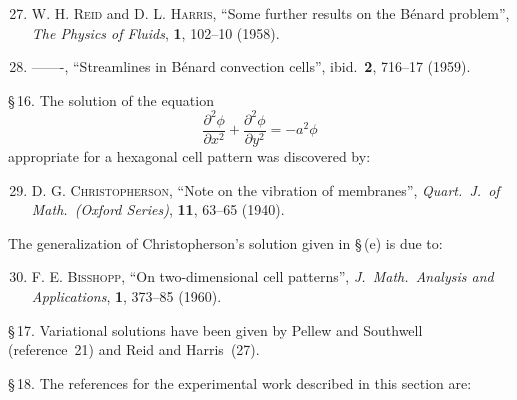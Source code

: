 \begin{enumerate}
\setcounter{enumi}{26}

\item \textsc{W. H. Reid} and \textsc{D. L. Harris}, ``Some further results on the B\'enard
  problem'', \textit{The Physics of Fluids}, \textbf{1}, 102--10 (1958).

\item -------, ``Streamlines in B\'enard convection cells'', ibid.\ \textbf{2}, 716--17
  (1959).

\end{enumerate}

\noindent \S\,16. The solution of the equation
%
\[ \frac{\partial^2\phi}{\partial x^2} + \frac{\partial^2\phi}{\partial y^2} = -a^2\phi \]
%
appropriate for a hexagonal cell pattern was discovered by:

\begin{enumerate}
\setcounter{enumi}{28}

\item \textsc{D. G. Christopherson}, ``Note on the vibration of membranes'',
  \textit{Quart.\ J.\ of Math.\ (Oxford Series)}, \textbf{11}, 63--65 (1940).

\end{enumerate}

\noindent The generalization of Christopherson's solution given in \S\,(e) is due to:

\begin{enumerate}
\setcounter{enumi}{29}

\item \textsc{F. E. Bisshopp}, ``On two-dimensional cell patterns'',
  \textit{J.\ Math.\ Analysis and Applications}, \textbf{1}, 373--85 (1960).

\end{enumerate}

\noindent \S\,17. Variational solutions have been given by Pellew and Southwell (reference~21)
and Reid and Harris~(27).

\noindent \S\,18. The references for the experimental work described in this section are:

